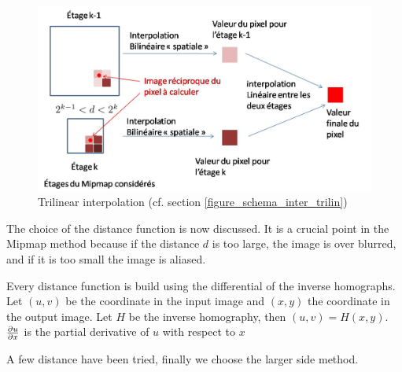 \label{figure_schema_inter_trilin}
\begin{figure}[h!]
\centering
\includegraphics[scale=0.5]{intertrilineaire.jpg}
\caption{Trilinear interpolation (cf. section \ref{figure_schema_inter_trilin})}
\label{intertrilineaire}
\end{figure}

\label{fonctiondistance}

The choice of the distance function is now discussed. It is a crucial point in the Mipmap method because if the distance $d$ is too large, the image is over blurred, and if it is too small the image is aliased.

Every distance function is build using the differential of the inverse homographs. Let $(u,v)$ be the coordinate in the input image and $(x,y)$ the coordinate in the output image. Let $H$ be the inverse homography, then $(u,v)=H(x,y)$. $\frac{\partial u}{\partial x}$ is the partial derivative of $u$ with respect to $x$

A few distance have been tried, finally we choose the larger side method.






